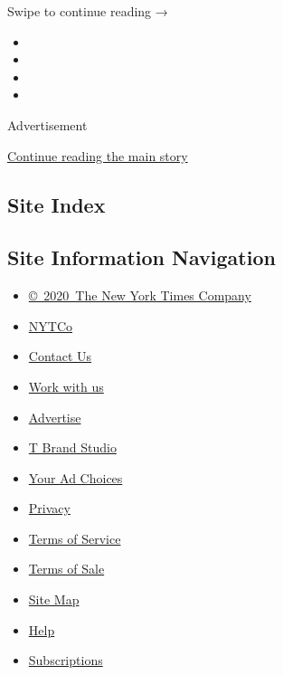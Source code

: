 Swipe to continue reading →

\begin{itemize}
\item
\item
\item
\item
\end{itemize}

Advertisement

\protect\hyperlink{after-bottom}{Continue reading the main story}

\hypertarget{site-index}{%
\subsection{Site Index}\label{site-index}}

\hypertarget{site-information-navigation}{%
\subsection{Site Information
Navigation}\label{site-information-navigation}}

\begin{itemize}
\tightlist
\item
  \href{https://help.nytimes.com/hc/en-us/articles/115014792127-Copyright-notice}{©~2020~The
  New York Times Company}
\end{itemize}

\begin{itemize}
\tightlist
\item
  \href{https://www.nytco.com/}{NYTCo}
\item
  \href{https://help.nytimes.com/hc/en-us/articles/115015385887-Contact-Us}{Contact
  Us}
\item
  \href{https://www.nytco.com/careers/}{Work with us}
\item
  \href{https://nytmediakit.com/}{Advertise}
\item
  \href{http://www.tbrandstudio.com/}{T Brand Studio}
\item
  \href{https://www.nytimes.com/privacy/cookie-policy\#how-do-i-manage-trackers}{Your
  Ad Choices}
\item
  \href{https://www.nytimes.com/privacy}{Privacy}
\item
  \href{https://help.nytimes.com/hc/en-us/articles/115014893428-Terms-of-service}{Terms
  of Service}
\item
  \href{https://help.nytimes.com/hc/en-us/articles/115014893968-Terms-of-sale}{Terms
  of Sale}
\item
  \href{https://spiderbites.nytimes.com}{Site Map}
\item
  \href{https://help.nytimes.com/hc/en-us}{Help}
\item
  \href{https://www.nytimes.com/subscription?campaignId=37WXW}{Subscriptions}
\end{itemize}
